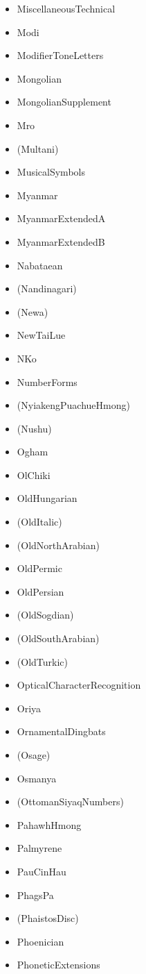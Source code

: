 \documentclass{article}
\newenvironment{itemlist}{%
  \begin{itemize}
	\setlength{\itemsep}{0pt}
	\setlength{\parsep}{0pt}
	\setlength{\topsep}{0pt}
	\setlength{\partopsep}{0pt}
	\setlength{\parskip}{0pt}
	\setlength{\labelsep}{5pt}}%
{
  \end{itemize}}
\begin{document}
\begin{multicols*}{2}
\begin{itemlist}
				\item MiscellaneousTechnical
				\item Modi
				\item ModifierToneLetters
				\item Mongolian
				\item MongolianSupplement
				\item Mro
				\item (Multani)
				\item MusicalSymbols
				\item Myanmar
				\item MyanmarExtendedA
				\item MyanmarExtendedB
				\item Nabataean
				\item (Nandinagari)
				\item (Newa)
				\item NewTaiLue
				\item NKo
				\item NumberForms
				\item (NyiakengPuachueHmong)
				\item (Nushu)
				\item Ogham
				\item OlChiki
				\item OldHungarian
				\item (OldItalic)
				\item (OldNorthArabian)
				\item OldPermic
				\item OldPersian
				\item (OldSogdian)
				\item (OldSouthArabian)
				\item (OldTurkic)
				\item OpticalCharacterRecognition
				\item Oriya
				\item OrnamentalDingbats
				\item (Osage)
				\item Osmanya
				\item (OttomanSiyaqNumbers)
				\item PahawhHmong
				\item Palmyrene
				\item PauCinHau
				\item PhagsPa
				\item (PhaistosDisc)
				\item Phoenician
				\item PhoneticExtensions

\end{itemlist}
\end{multicols*}
\end{document}
